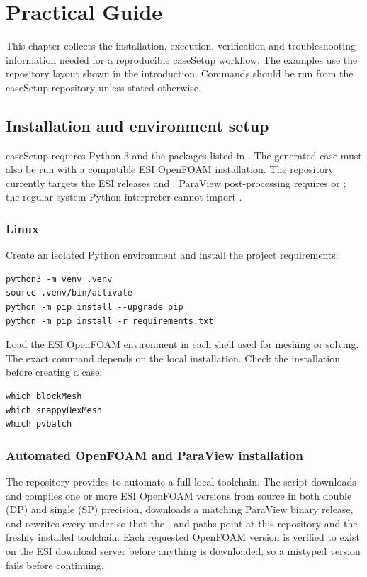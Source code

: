 \section{Practical Guide}

This chapter collects the installation, execution, verification and troubleshooting information needed for a reproducible caseSetup workflow. The examples use the repository layout shown in the introduction. Commands should be run from the caseSetup repository unless stated otherwise.

\subsection{Installation and environment setup}

caseSetup requires Python 3 and the packages listed in . The generated case must also be run with a compatible ESI OpenFOAM installation. The repository currently targets the ESI releases  and . ParaView post-processing requires  or ; the regular system Python interpreter cannot import .

\subsubsection{Linux}

Create an isolated Python environment and install the project requirements:
\begin{lstlisting}
python3 -m venv .venv
source .venv/bin/activate
python -m pip install --upgrade pip
python -m pip install -r requirements.txt
\end{lstlisting}

Load the ESI OpenFOAM environment in each shell used for meshing or solving. The exact command depends on the local installation. Check the installation before creating a case:
\begin{lstlisting}
which blockMesh
which snappyHexMesh
which pvbatch
\end{lstlisting}

\subsubsection{Automated OpenFOAM and ParaView installation}

The repository provides  to automate a full local toolchain. The script downloads and compiles one or more ESI OpenFOAM versions from source in both double (DP) and single (SP) precision, downloads a matching ParaView binary release, and rewrites every  under  so that the ,  and  paths point at this repository and the freshly installed toolchain. Each requested OpenFOAM version is verified to exist on the ESI download server before anything is downloaded, so a mistyped version fails before continuing.

